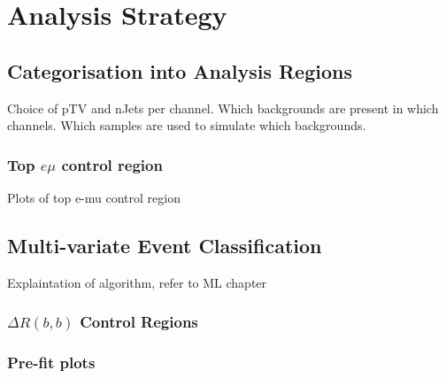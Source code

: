 \chapter{Analysis Strategy}%
\label{ch:strategy}
\section{Categorisation into Analysis Regions}
\label{sec:ana-regions}
Choice of pTV and nJets per channel.
Which backgrounds are present in which channels.
Which samples are used to simulate which backgrounds.


\subsection{Top \texorpdfstring{$e \mu$}{e mu} control region}%
\label{sec:topemucr}
Plots of top e-mu control region
\section{Multi-variate Event Classification}%
\label{sec:mva}
Explaintation of algorithm, refer to ML chapter



\subsection{\texorpdfstring{$\Delta R(b,b)$}{DRbb} Control Regions}%
\label{sec:control-region-defintions}

\subsection{Pre-fit plots}












